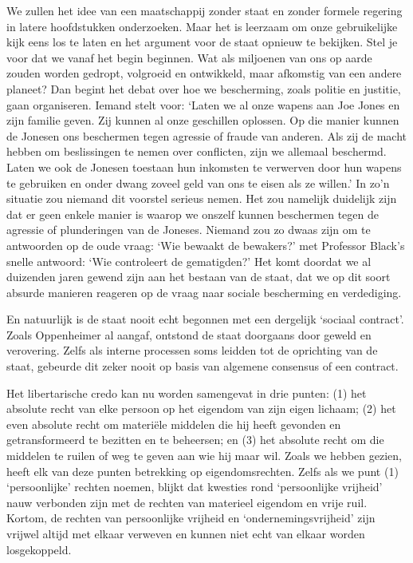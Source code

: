\documentclass[
  a5paper,
  smalldemyvopaper,10pt,twoside,onecolumn,openright,extrafontsizes,hidelinks]{memoir}
\newlength\drop
\begin{document}
We zullen het idee van een maatschappij zonder staat en zonder formele
regering in latere hoofdstukken onderzoeken. Maar het is leerzaam om
onze gebruikelijke kijk eens los te laten en het argument voor de staat
opnieuw te bekijken. Stel je voor dat we vanaf het begin beginnen. Wat
als miljoenen van ons op aarde zouden worden gedropt, volgroeid en
ontwikkeld, maar afkomstig van een andere planeet? Dan begint het debat
over hoe we bescherming, zoals politie en justitie, gaan organiseren.
Iemand stelt voor: `Laten we al onze wapens aan Joe Jones en zijn
familie geven. Zij kunnen al onze geschillen oplossen. Op die manier
kunnen de Jonesen ons beschermen tegen agressie of fraude van anderen.
Als zij de macht hebben om beslissingen te nemen over conflicten, zijn
we allemaal beschermd. Laten we ook de Jonesen toestaan hun inkomsten te
verwerven door hun wapens te gebruiken en onder dwang zoveel geld van
ons te eisen als ze willen.' In zo'n situatie zou niemand dit voorstel
serieus nemen. Het zou namelijk duidelijk zijn dat er geen enkele manier
is waarop we onszelf kunnen beschermen tegen de agressie of plunderingen
van de Joneses. Niemand zou zo dwaas zijn om te antwoorden op de oude
vraag: `Wie bewaakt de bewakers?' met Professor Black's snelle antwoord:
`Wie controleert de gematigden?' Het komt doordat we al duizenden jaren
gewend zijn aan het bestaan van de staat, dat we op dit soort absurde
manieren reageren op de vraag naar sociale bescherming en verdediging.

En natuurlijk is de staat nooit echt begonnen met een dergelijk `sociaal
contract'. Zoals Oppenheimer al aangaf, ontstond de staat doorgaans door
geweld en verovering. Zelfs als interne processen soms leidden tot de
oprichting van de staat, gebeurde dit zeker nooit op basis van algemene
consensus of een contract.

Het libertarische credo kan nu worden samengevat in drie punten: (1) het
absolute recht van elke persoon op het eigendom van zijn eigen lichaam;
(2) het even absolute recht om materiële middelen die hij heeft gevonden
en getransformeerd te bezitten en te beheersen; en (3) het absolute
recht om die middelen te ruilen of weg te geven aan wie hij maar wil.
Zoals we hebben gezien, heeft elk van deze punten betrekking op
eigendomsrechten. Zelfs als we punt (1) `persoonlijke' rechten noemen,
blijkt dat kwesties rond `persoonlijke vrijheid' nauw verbonden zijn met
de rechten van materieel eigendom en vrije ruil. Kortom, de rechten van
persoonlijke vrijheid en `ondernemingsvrijheid' zijn vrijwel altijd met
elkaar verweven en kunnen niet echt van elkaar worden losgekoppeld.
\end{document}
